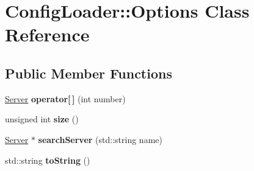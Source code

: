 \hypertarget{class_config_loader_1_1_options}{
\section{ConfigLoader::Options Class Reference}
\label{class_config_loader_1_1_options}
}
\subsection*{Public Member Functions}
\begin{DoxyCompactItemize}
\item 
\hypertarget{class_config_loader_1_1_options_a254f45b428a011a4b7d52282b7b3a470}{
\hyperlink{class_server}{Server} {\bfseries operator\mbox{[}$\,$\mbox{]}} (int number)}
\label{class_config_loader_1_1_options_a254f45b428a011a4b7d52282b7b3a470}

\item 
\hypertarget{class_config_loader_1_1_options_ac0eb538de93031a2c6fbeef90f91fdaa}{
unsigned int {\bfseries size} ()}
\label{class_config_loader_1_1_options_ac0eb538de93031a2c6fbeef90f91fdaa}

\item 
\hypertarget{class_config_loader_1_1_options_a57cc1506352875e86ca1fd876b5cc163}{
\hyperlink{class_server}{Server} $\ast$ {\bfseries searchServer} (std::string name)}
\label{class_config_loader_1_1_options_a57cc1506352875e86ca1fd876b5cc163}

\item 
\hypertarget{class_config_loader_1_1_options_ad18d4c69a14c39ad894e403dcd25d89a}{
std::string {\bfseries toString} ()}
\label{class_config_loader_1_1_options_ad18d4c69a14c39ad894e403dcd25d89a}

\end{DoxyCompactItemize}
